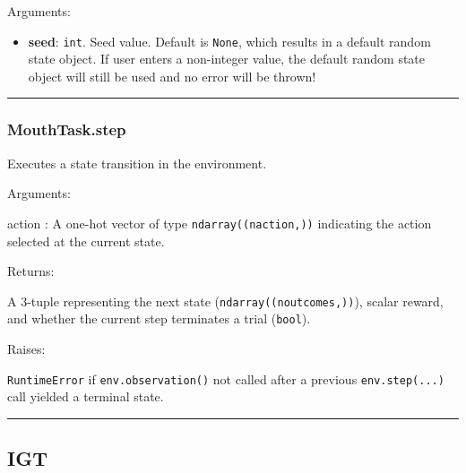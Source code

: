 Arguments:

\begin{itemize}
\tightlist
\item
  \textbf{seed}: \texttt{int}. Seed value. Default is \texttt{None},
  which results in a default random state object. If user enters a
  non-integer value, the default random state object will still be used
  and no error will be thrown!
\end{itemize}

\begin{center}\rule{0.5\linewidth}{\linethickness}\end{center}

\subsubsection{MouthTask.step}\label{mouthtask.step}

\begin{Shaded}
\begin{Highlighting}[]
\end{Highlighting}
\end{Shaded}

Executes a state transition in the environment.

Arguments:

action : A one-hot vector of type \texttt{ndarray((naction,))}
indicating the action selected at the current state.

Returns:

A 3-tuple representing the next state (\texttt{ndarray((noutcomes,))}),
scalar reward, and whether the current step terminates a trial
(\texttt{bool}).

Raises:

\texttt{RuntimeError} if \texttt{env.observation()} not called after a
previous \texttt{env.step(...)} call yielded a terminal state.

\begin{center}\rule{0.5\linewidth}{\linethickness}\end{center}

\subsection{IGT}\label{igt}

\begin{Shaded}
\begin{Highlighting}[]
\end{Highlighting}
\end{Shaded}

